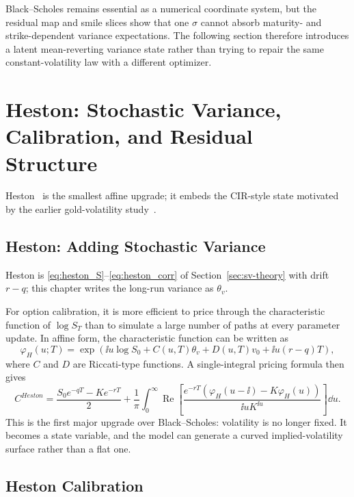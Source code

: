 Black--Scholes remains essential as a numerical coordinate system, but the residual map and smile slices show that one \(\sigma\) cannot absorb maturity- and strike-dependent variance expectations. The following section therefore introduces a latent mean-reverting variance state rather than trying to repair the same constant-volatility law with a different optimizer.

\section{Heston: Stochastic Variance, Calibration, and Residual Structure}
\label{sec:heston-calibration}

Heston~\cite{Heston1993} is the smallest affine upgrade; it embeds the CIR-style state motivated by the earlier gold-volatility study~\cite{team7}.
\subsection{Heston: Adding Stochastic Variance}

Heston is \eqref{eq:heston_S}--\eqref{eq:heston_corr} of Section~\ref{sec:sv-theory} with drift \(r-q\); this chapter writes the long-run variance as \(\theta_v\).

For option calibration, it is more efficient to price through the characteristic function of \(\log S_T\) than to simulate a large number of paths at every parameter update. In affine form, the characteristic function can be written as
\begin{equation}
    \varphi_H(u;T)
    =
    \exp\left(
        \ii u\log S_0 + C(u,T)\theta_v + D(u,T)v_0 + \ii u(r-q)T
    \right),
\end{equation}
where \(C\) and \(D\) are Riccati-type functions. A single-integral pricing formula then gives
\begin{equation}
    C^{Heston}
    =
    \frac{S_0e^{-qT}-Ke^{-rT}}{2}
    +
    \frac{1}{\pi}\int_0^\infty
    \operatorname{Re}
    \left[
        \frac{e^{-rT}\left(\varphi_H(u-\ii)-K\varphi_H(u)\right)}
        {\ii u K^{\ii u}}
    \right]\dd u.
\end{equation}
This is the first major upgrade over Black--Scholes: volatility is no longer fixed. It becomes a state variable, and the model can generate a curved implied-volatility surface rather than a flat one.
\subsection{Heston Calibration}

